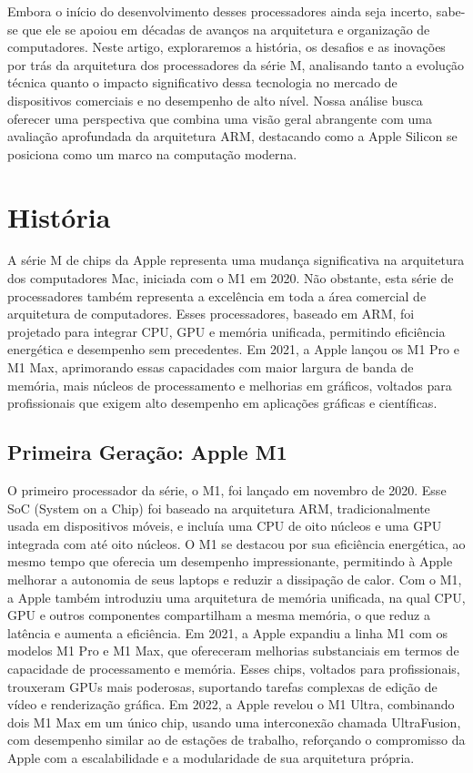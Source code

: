 \documentclass[a4paper,times,12pt]{article}
\begin{document}
Embora o início do desenvolvimento desses processadores ainda seja incerto, sabe-se que ele se apoiou em décadas de avanços na arquitetura e organização de computadores. Neste artigo, exploraremos a história, os desafios e as inovações por trás da arquitetura dos processadores da série M, analisando tanto a evolução técnica quanto o impacto significativo dessa tecnologia no mercado de dispositivos comerciais e no desempenho de alto nível. Nossa análise busca oferecer uma perspectiva que combina uma visão geral abrangente com uma avaliação aprofundada da arquitetura ARM, destacando como a Apple Silicon se posiciona como um marco na computação moderna.

\section{História}
\hspace{+15pt} 
A série M de chips da Apple representa uma mudança significativa na arquitetura dos computadores Mac, iniciada com o M1 em 2020. Não obstante, esta série de processadores também representa a excelência em toda a área comercial de arquitetura de computadores. Esses processadores, baseado em ARM, foi projetado para integrar CPU, GPU e memória unificada, permitindo eficiência energética e desempenho sem precedentes. Em 2021, a Apple lançou os M1 Pro e M1 Max, aprimorando essas capacidades com maior largura de banda de memória, mais núcleos de processamento e melhorias em gráficos, voltados para profissionais que exigem alto desempenho em aplicações gráficas e científicas.
\subsection{Primeira Geração: Apple M1}
\hspace{+15pt} 
O primeiro processador da série, o M1, foi lançado em novembro de 2020. Esse SoC (System on a Chip) foi baseado na arquitetura ARM, tradicionalmente usada em dispositivos móveis, e incluía uma CPU de oito núcleos e uma GPU integrada com até oito núcleos. O M1 se destacou por sua eficiência energética, ao mesmo tempo que oferecia um desempenho impressionante, permitindo à Apple melhorar a autonomia de seus laptops e reduzir a dissipação de calor. Com o M1, a Apple também introduziu uma arquitetura de memória unificada, na qual CPU, GPU e outros componentes compartilham a mesma memória, o que reduz a latência e aumenta a eficiência.
Em 2021, a Apple expandiu a linha M1 com os modelos M1 Pro e M1 Max, que ofereceram melhorias substanciais em termos de capacidade de processamento e memória. Esses chips, voltados para profissionais, trouxeram GPUs mais poderosas, suportando tarefas complexas de edição de vídeo e renderização gráfica. Em 2022, a Apple revelou o M1 Ultra, combinando dois M1 Max em um único chip, usando uma interconexão chamada UltraFusion, com desempenho similar ao de estações de trabalho, reforçando o compromisso da Apple com a escalabilidade e a modularidade de sua arquitetura própria.
\end{document}
